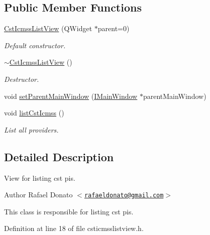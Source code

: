 \subsection*{\-Public \-Member \-Functions}
\begin{DoxyCompactItemize}
\item 
\hyperlink{class_cst_icmss_list_view_a6ec8a211be21300bf04a7706a66784ee}{\-Cst\-Icmss\-List\-View} (\-Q\-Widget $\ast$parent=0)
\begin{DoxyCompactList}\small\item\em \-Default constructor. \end{DoxyCompactList}\item 
\hyperlink{class_cst_icmss_list_view_ad701891399a02e2f93caf71709bea83a}{$\sim$\-Cst\-Icmss\-List\-View} ()
\begin{DoxyCompactList}\small\item\em \-Destructor. \end{DoxyCompactList}\item 
void \hyperlink{class_cst_icmss_list_view_a306f5b4a6380bbb28fb3defd24706bab}{set\-Parent\-Main\-Window} (\hyperlink{class_i_main_window}{\-I\-Main\-Window} $\ast$parent\-Main\-Window)
\item 
void \hyperlink{class_cst_icmss_list_view_a7ed2542d881b0df3551ece744b48d894}{list\-Cst\-Icmss} ()
\begin{DoxyCompactList}\small\item\em \-List all providers. \end{DoxyCompactList}\end{DoxyCompactItemize}


\subsection{\-Detailed \-Description}
\-View for listing cst pis. 

\begin{DoxyAuthor}{\-Author}
\-Rafael \-Donato $<$\href{mailto:rafaeldonato@gmail.com}{\tt rafaeldonato@gmail.\-com}$>$
\end{DoxyAuthor}
\-This class is responsible for listing cst pis. 

\-Definition at line 18 of file csticmsslistview.\-h.



